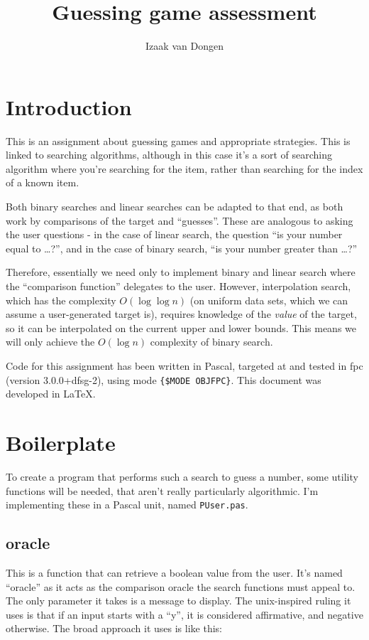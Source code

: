 \documentclass{article}
\title{Guessing game assessment}
\author{Izaak van Dongen}
\begin{document}
    \maketitle
    \tableofcontents
    \lstlistoflistings

    \section{Introduction}
    This is an assignment about guessing games and appropriate strategies. This
    is linked to searching algorithms, although in this case it's a sort of
    searching algorithm where you're searching for the item, rather than
    searching for the index of a known item.

    Both binary searches and linear
    searches can be adapted to that end, as both work by comparisons of the
    target and ``guesses''. These are analogous to asking the user questions - in
    the case of linear search, the question ``is your number equal to \ldots?'',
    and in the case of binary search, ``is your number greater than \ldots?''

    Therefore, essentially we need only to implement binary and linear search
    where the ``comparison function'' delegates to the user.  However,
    interpolation search, which has the complexity $O(\log\log n)$ (on uniform
    data sets, which we can assume a user-generated target is), requires
    knowledge of the \textit{value} of the target, so it can be interpolated on
    the current upper and lower bounds. This means we will only achieve the
    $O(\log n)$ complexity of binary search.

    Code for this assignment has been written in Pascal, targeted at and tested
    in fpc (version 3.0.0+dfsg-2), using mode \verb|{$MODE OBJFPC}|. This
    document was developed in \LaTeX.

    \section{Boilerplate}
    To create a program that performs such a search to guess a number, some
    utility functions will be needed, that aren't really particularly
    algorithmic. I'm implementing these in a Pascal unit, named
    \verb|PUser.pas|.

    \subsection{oracle}
    This is a function that can retrieve a boolean value from the user. It's
    named ``oracle'' as it acts as the comparison oracle the search functions
    must appeal to. The only parameter it takes is a message to display. The
    unix-inspired ruling it uses is that if an input starts with a ``y'', it is
    considered affirmative, and negative otherwise. The broad approach it uses
    is like this:
\end{document}
